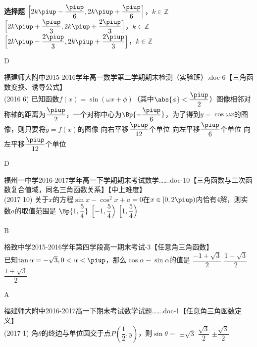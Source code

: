 \begin{exercise}{\bf 选择题}
       {$\Bigl[2k\piup-\dfrac{\piup}6,2k\piup+\dfrac{\piup}6 \Bigr]$，$k\in\mathbb{Z}$}
       {$\Bigl[2k\piup+\dfrac{\piup}3,2k\piup+\dfrac{2\piup}3 \Bigr]$，$k\in\mathbb{Z}$}
       {$\Bigl[2k\piup-\dfrac{2\piup}3,2k\piup+\dfrac{2\piup}3 \Bigr]$，$k\in\mathbb{Z}$}
      \begin{answer}
        D
      \end{answer}
    \item 福建师大附中2015-2016学年高一数学第二学期期末检测（实验班）.doc-6【三角函数变换、诱导公式】\\
      (2016  6)
      已知函数$f(x)=\sin(\omega x+\phi)$（其中$\abs{\phi}<\dfrac{\piup}2$）图像相邻对称轴的距离为$\dfrac{\piup}2$，一个对称中心为$\Bp{-\dfrac{\piup}6}$，为了得到$y=\cos\omega x$的图像，则只要将$y=f(x)$的图像\xz
       {向右平移$\dfrac{\piup}{12}$个单位}
       {向左平移$\dfrac{\piup}6$个单位}
       {向左平移$\dfrac{\piup}{12}$个单位}
      \begin{answer}
        D
      \end{answer}
    \item 福州一中学2016-2017学年高一下学期期末考试数学…….doc-10【三角函数与二次函数复合值域，同名三角函数关系】【中上难度】\\
      (2017  10)
      关于$x$的方程$\sin x-\cos^2x+a=0$在$x\in[0,2\piup)$内恰有4解，则实数$a$的取值范围是\xz
       {$\Bp{1,\dfrac54}$}
       {$\Bigl[-1,\dfrac54\Bigr)$}
       {$\Bigl[1,\dfrac54\Bigr)$}
      \begin{answer}
        B
      \end{answer}
    \item 格致中学2015-2016学年第四学段高一期末考试-3【任意角三角函数】\\
      已知$\tan\alpha=-\sqrt3,0<\alpha<\piup$，那么$\cos\alpha-\sin\alpha$的值是\xz
        {$\dfrac{-1+\sqrt3}2$}
        {$\dfrac{1-\sqrt3}2$}
        {$\dfrac{1+\sqrt3}2$}
      \begin{answer}
        A
      \end{answer}
    \item 福建师大附中2016-2017高一下期末考试数学试题…….doc-1【任意角三角函数定义】\\
      (2017  1)
      角$\theta$的终边与单位圆交于点$P(\dfrac12,y)$，则$\sin\theta=$\xz
       {$\pm\sqrt3$}
       {$\dfrac{\sqrt3}2$}
       {$\pm\dfrac{\sqrt3}2$}

\end{exercise}
